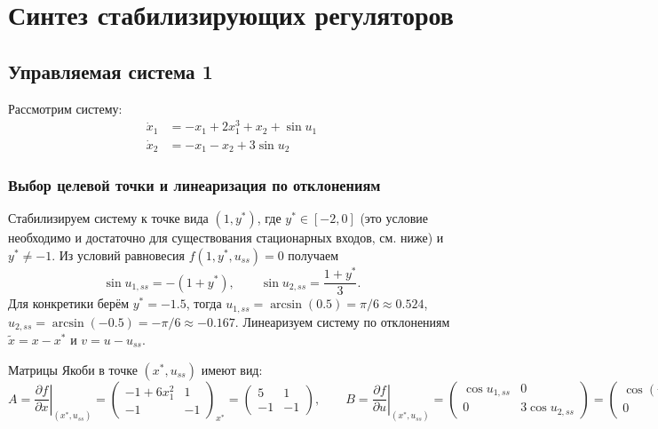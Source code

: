 \section*{Синтез стабилизирующих регуляторов}

\subsection*{Управляемая система 1}

Рассмотрим систему:
\begin{align}
\dot{x}_1 &= -x_1 + 2x_1^3 + x_2 + \sin u_1 \\
\dot{x}_2 &= -x_1 - x_2 + 3\sin u_2
\end{align}

\subsubsection*{Выбор целевой точки и линеаризация по отклонениям}

Стабилизируем систему к точке вида $(1,y^*)$, где $y^*\in[-2,0]$ (это условие необходимо и достаточно для существования стационарных входов, см. ниже) и $y^*\neq -1$.
Из условий равновесия $f(1,y^*,u_{ss})=0$ получаем
\[
\sin u_{1,ss} = -(1+y^*),\qquad \sin u_{2,ss} = \frac{1+y^*}{3}.
\]
Для конкретики берём $y^*=-1.5$, тогда $u_{1,ss}=\arcsin(0.5)=\pi/6\approx0.524$, $u_{2,ss}=\arcsin(-0.5)= -\pi/6\approx-0.167$.
Линеаризуем систему по отклонениям $\tilde x = x - x^*$ и $v = u - u_{ss}$.

Матрицы Якоби в точке $(x^*,u_{ss})$ имеют вид:
\[
A = \left.\frac{\partial f}{\partial x}\right|_{(x^*,u_{ss})} =
\begin{pmatrix}
-1 + 6x_1^2 & 1 \\
-1 & -1
\end{pmatrix}_{x^*} =
\begin{pmatrix}
5 & 1 \\
-1 & -1
\end{pmatrix},\qquad
B = \left.\frac{\partial f}{\partial u}\right|_{(x^*,u_{ss})} =
\begin{pmatrix}
\cos u_{1,ss} & 0 \\
0 & 3\cos u_{2,ss}
\end{pmatrix} =
\begin{pmatrix}
\cos(\pi/6) & 0 \\
0 & 3\cos(-\pi/6)
\end{pmatrix} =
\begin{pmatrix}
0.8660 & 0 \\
0 & 2.9580
\end{pmatrix}.
\]

